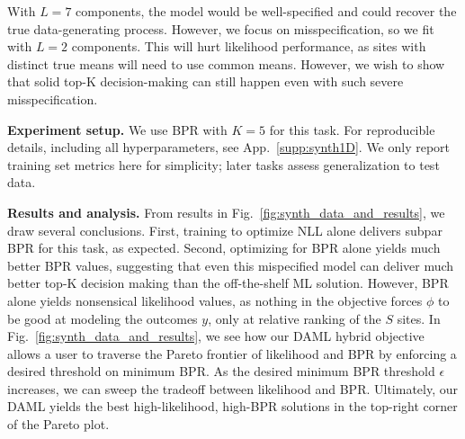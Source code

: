 With $L{=}7$ components, the model would be well-specified and could recover the true data-generating process. However, we focus on misspecification, so we fit with $L{=}2$ components. This will hurt likelihood performance, as sites with distinct true means will need to use common means. However, we wish to show that solid top-K decision-making can still happen even with such severe misspecification.

\textbf{Experiment setup.} We use BPR with $K=5$ for this task. 
For reproducible details, including all hyperparameters, see App.~\ref{supp:synth1D}.
We only report training set metrics here for simplicity; later tasks assess generalization to test data.




\textbf{Results and analysis.}
From results in Fig.~\ref{fig:synth_data_and_results}, we draw several conclusions.
First, training to optimize NLL alone delivers subpar BPR for this task, as expected. 
Second, optimizing for BPR alone yields much better BPR values, suggesting that even this mispecified model can deliver much better top-K decision making than the off-the-shelf ML solution. However, BPR alone yields nonsensical likelihood values, as nothing in the objective forces $\phi$ to be good at modeling the outcomes $y$, only at relative ranking of the $S$ sites.
In Fig.~\ref{fig:synth_data_and_results}, we see how our DAML hybrid objective allows a user to traverse the Pareto frontier of likelihood and BPR by enforcing a desired threshold on minimum BPR. As the desired minimum BPR threshold $\epsilon$ increases, we can sweep the tradeoff between likelihood and BPR. Ultimately, our DAML yields the best high-likelihood, high-BPR solutions in the top-right corner of the Pareto plot.


